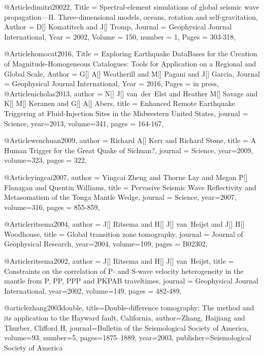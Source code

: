 @Article{dimitri20022,
  Title                    = {Spectral-element simulations of global seismic wave propagation—II. Three-dimensional models, oceans, rotation and self-gravitation},
  Author                   = {D[] Komatitsch and J[] Tromp},
  Journal                  = Geophysical Journal International,
  Year                     = {2002},
  Volume                   = {150},
  number                   = {1},
  Pages                    = {303-318},
}



@Article{homocat2016,
  Title                    = {Exploring Earthquake DataBases for the Creation of Magnitude-Homogeneous Catalogues: Tools for Application on a Regional and Global Scale},
  Author                   = {G[] A[] Weatherill and M[] Pagani and J[] Garcia},
  Journal                  = {Geophysical Journal International},
  Year                     = {2016},
  Pages                    = {in press},
}
@Article{nicholas2013,
  author =	 {N[] J[] van~der~Elst and Heather M[] Savage and K[] M[] Keranen and G[] A[] Abers},
  title =	 {Enhanced Remote Earthquake Triggering at Fluid-Injection Sites in the Midwestern United States},
  journal =	 {Science},
  year=2013,
  volume=341,
  pages =	 {164-167},
}

@Article{wenchuan2009,
  author =	 {Richard A[] Kerr and Richard Stone},
  title =	 {A Human Trigger for the Great Quake of Sichuan?},
  journal =	 {Science},
  year=2009,
  volume=323,
  pages =	 {322},
}

@Article{yingcai2007,
  author =	 {Yingcai Zheng and Thorne Lay and Megan P[] Flanagan and Quentin Williams},
  title =	 {Pervasive Seismic Wave Reflectivity and Metasomatism of the Tonga Mantle Wedge},
  journal =	 {Science},
  year=2007,
  volume=316,
  pages =	 {855-859},
}

@Article{ritsema2004,
  author =	 {J[] Ritsema and H[] J[] van~Heijst and J[] H[] Woodhouse},
  title =	 {Global transition zone tomography},
  journal =	 {Journal of Geophysical Research},
  year=2004,
  volume=109,
  pages =	 {B02302},
}

@Article{ritsema2002,
  author =	 {J[] Ritsema and H[] J[] van~Heijst},
  title =	 {Constraints on the correlation of {P}- and {S}-wave velocity heterogeneity in the mantle from {P}, {PP}, {PPP} and {PKPAB} traveltimes},
  journal =	 {Geophysical Journal International},
  year=2002,
  volume=149,
  pages =	 {482-489},
}

@article{zhang2003double,
  title={Double-difference tomography: The method and its application to the Hayward fault, California},
  author={Zhang, Haijiang and Thurber, Clifford H},
  journal={Bulletin of the Seismological Society of America},
  volume={93},
  number={5},
  pages={1875--1889},
  year={2003},
  publisher={Seismological Society of America}
}

